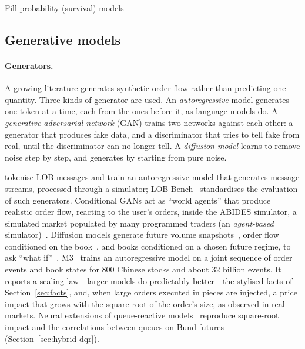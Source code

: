 \begin{modelcard}{Fill-probability (survival) models}
\end{modelcard}

\subsection{Generative models}
\label{sec:deep-gen}

\paragraph{Generators.} A growing literature generates synthetic order flow rather than predicting one quantity.
Three kinds of generator are used. An \emph{autoregressive} model generates one token at a time, each from the ones
before it, as language models do. A \emph{generative adversarial network} (GAN) trains two networks against each
other: a generator that produces fake data, and a discriminator that tries to tell fake from real, until the
discriminator can no longer tell. A \emph{diffusion model} learns to remove noise step by step, and generates by
starting from pure noise.

\citet{nagy2023} tokenise LOB messages and train an autoregressive model that generates message streams, processed
through a simulator; LOB-Bench~\citep{lobbench2025} standardises the evaluation of such generators. Conditional GANs
act as ``world agents'' that produce realistic order flow, reacting to the user's orders, inside the ABIDES
simulator, a simulated market populated by many programmed traders (an \emph{agent-based}
simulator)~\citep{coletta2021,coletta2022,byrd2020abides}. Diffusion models generate future volume
snapshots~\citep{diffvolume}, order flow conditioned on the book~\citep{berti2025trades}, and books conditioned on a
chosen future regime, to ask ``what if''~\citep{wang2026difflob}. M3~\citep{m3lob} trains an autoregressive model on a
joint sequence of order events and book states for 800 Chinese stocks and about 32 billion events. It reports a
scaling law---larger models do predictably better---the stylised facts of Section~\ref{sec:facts}, and, when large
orders executed in pieces are injected, a price impact that grows with the square root of the order's size, as
observed in real markets. Neural extensions of queue-reactive models~\citep{deepqr} reproduce square-root impact and
the correlations between queues on Bund futures (Section~\ref{sec:hybrid-dqr}).

